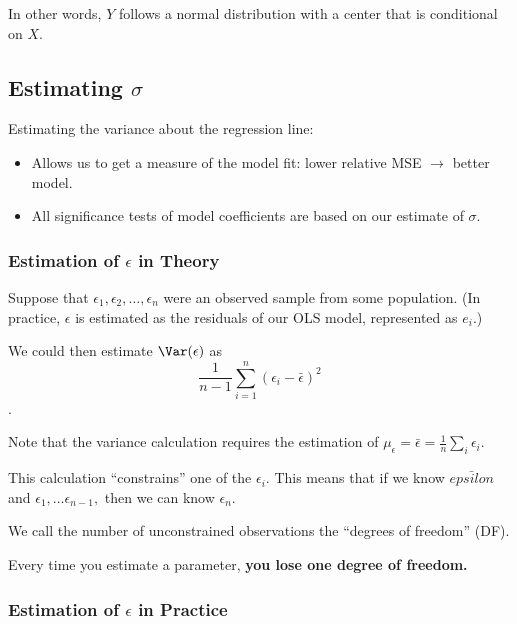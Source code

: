 \documentclass[12pt]{notes}
\begin{document}
In other words, $Y$ follows a normal distribution with a center that is conditional on $X$. 

\subsection*{Estimating $\sigma$}
Estimating the variance about the regression line:
\begin{itemize}
\item Allows us to get a measure of the model fit: lower relative MSE $\rightarrow$ better model. 
\item All significance tests of model coefficients are based on our estimate of $\sigma$. 
\end{itemize} 

\subsubsection*{Estimation of $\epsilon$ in Theory}
Suppose that $\epsilon_1, \epsilon_2, \ldots, \epsilon_n$ were an observed sample from some population. (In practice, $\epsilon$ is estimated as the residuals of our OLS model, represented as $e_i$.)

\nspace
We could then estimate $\Var(\epsilon)$ as 
\[\frac{1}{n-1}\sum_{i=1}^n\left(\epsilon_i - \bar{\epsilon}\right)^2\].

\nspace
Note that the variance calculation requires the estimation of $\mu_\epsilon = \bar{\epsilon} = \frac{1}{n}\sum_i\epsilon_i.$

\nspace
This calculation ``constrains'' one of the $\epsilon_i$. This means that if we know $\bar{epsilon}$ and $\epsilon_1, \ldots \epsilon_{n-1},$ then we can know $\epsilon_n$. 

\nspace
We call the number of unconstrained observations the ``degrees of freedom'' (DF). 

\nspace
Every time you estimate a parameter, \textbf{you lose one degree of freedom.}

\begin{minipage}[l][2cm][c]{\textwidth}
\end{minipage}

\subsubsection*{Estimation of $\epsilon$ in Practice}
\end{document}

